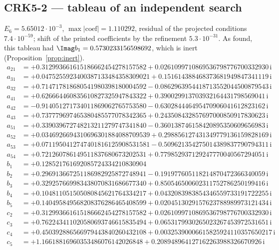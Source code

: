 \subsection*{CRK5-2 --- tableau of an independent search}
$E_{6}=5.65012\cdot10^{-3}$, $\max|\text{coef}|=1.110292$, residual of the projected conditions $7.4\cdot10^{-59}$; shift of the printed coefficients by the refinement $5.3\cdot10^{-31}$. As found, this tableau had $\Imag b_1=0.5730233156598692$, which is inert (Proposition~\ref{prop:inert}).
{\small
\begin{align*}
a_{21} &= +0.312993661615186662454278157582 + 0.0261099710869536798776700332930\,\mathrm{i}\\
a_{31} &= +0.0475255923400387133484358309021 + 0.151614388468373681949847341119\,\mathrm{i}\\
a_{32} &= +0.714717818680541980398180004592 - 0.0862963954418713552044500879543\,\mathrm{i}\\
a_{41} &= +0.626664460835610827325947843322 + 0.390029913703932164431798569041\,\mathrm{i}\\
a_{42} &= -0.914051271734011869062765753580 - 0.630284446495470906041612823162\,\mathrm{i}\\
a_{43} &= +0.737779697465380485577078342365 + 0.243508432857697000850917830623\,\mathrm{i}\\
a_{51} &= +0.339039672748213211279747341840 - 0.360138746158420895350609656983\,\mathrm{i}\\
a_{52} &= +0.0346926694310696301884088709539 + 0.298856127431349779136159828169\,\mathrm{i}\\
a_{53} &= +0.0711950412747401816125908531581 - 0.509621354275014389837790794311\,\mathrm{i}\\
a_{54} &= +0.721260786149511837680673202531 + 0.779852937129247770040567294051\,\mathrm{i}\\[1mm]
b_{1} &= +0.128521761692085724334210830904\\
b_{2} &= +0.296913667251186982925872748941 - 0.191977605118214870472366340059\,\mathrm{i}\\
b_{3} &= +0.329257669983438070831686677340 + 0.850546500602311752786250199416\,\mathrm{i}\\
b_{4} &= +0.104811051505080845621764334217 + 0.0432083983854346559733191722255\,\mathrm{i}\\
b_{5} &= +0.140495849568208376286465408599 + 0.0204513029157623788989973121434\,\mathrm{i}\\[1mm]
c_{2} &= +0.312993661615186662454278157582 + 0.0261099710869536798776700332930\,\mathrm{i}\\
c_{3} &= +0.762243411020580693746615835494 + 0.0653179930265023267453972531651\,\mathrm{i}\\
c_{4} &= +0.450392886566979443840260432108 + 0.00325390006615825924110357650217\,\mathrm{i}\\
c_{5} &= +1.16618816960353486076142026848 + 0.208948964127162263988326670926\,\mathrm{i}
\end{align*}
}

